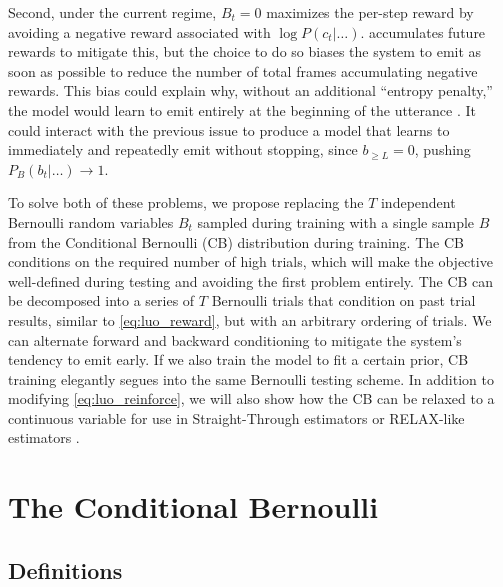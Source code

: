 \documentclass{article}
\begin{document}
Second, under the current regime, $B_t = 0$ maximizes the per-step reward by
avoiding a negative reward associated with $\log P(c_t|\ldots)$.
 accumulates future rewards to mitigate this, but the
choice to do so biases the system to emit as soon as possible to reduce the
number of total frames accumulating negative rewards. This bias could explain
why, without an additional ``entropy penalty,'' the model would learn to emit
entirely at the beginning of the utterance
\cite{luoLearningOnlineAlignments2017}. It could interact with the previous
issue to produce a model that learns to immediately and repeatedly emit without
stopping, since $b_{\geq L} = 0$, pushing $P_B(b_t|\ldots) \to 1$.

To solve both of these problems, we propose replacing the $T$ independent
Bernoulli random variables $B_t$ sampled during training with a single sample
$B$ from the Conditional Bernoulli (CB) distribution during training. The CB
conditions on the required number of high trials, which will make the objective
well-defined during testing and avoiding the first problem entirely. The CB can
be decomposed into a series of $T$ Bernoulli trials that condition on past
trial results, similar to \cref{eq:luo_reward}, but with an arbitrary ordering
of trials. We can alternate forward and backward conditioning to mitigate the
system's tendency to emit early. If we also train the model to fit a certain
prior, CB training elegantly segues into the same Bernoulli testing scheme. In
addition to modifying \cref{eq:luo_reinforce}, we will also show how the CB can
be relaxed to a continuous variable for use in Straight-Through estimators
\cite{bengioEstimatingPropagatingGradients2013,jangCategoricalReparameterizationGumbelSoftmax2017}
or RELAX-like estimators
\cite{maddisonConcreteDistributionContinuous2017,grathwohlBackpropagationVoidOptimizing2018}.


\section{The Conditional Bernoulli} \label{sec:cb}
\subsection{Definitions} \label{sec:cb_defns}
\end{document}
